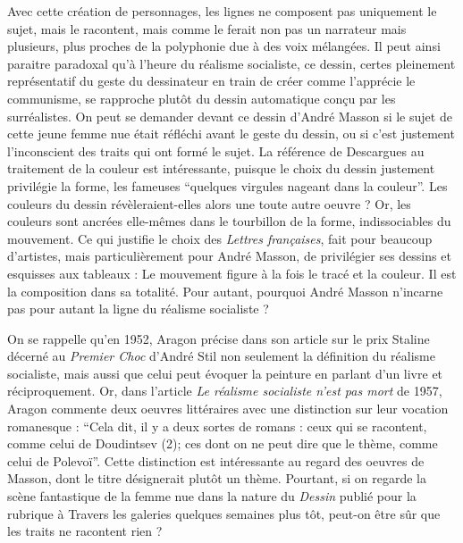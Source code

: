 {	Avec cette création de personnages, les lignes ne composent pas uniquement le sujet, mais le racontent, mais comme le ferait non pas un narrateur mais plusieurs, plus proches de la polyphonie due à des voix mélangées. Il peut ainsi paraitre paradoxal qu’à l’heure du réalisme socialiste, ce dessin, certes pleinement représentatif du geste du dessinateur en train de créer comme l’apprécie le communisme, se rapproche plutôt du dessin automatique conçu par les surréalistes. On peut se demander devant ce dessin d’André Masson si le sujet de cette jeune femme nue était réfléchi avant le geste du dessin, ou si c’est justement l’inconscient des traits qui ont formé le sujet. La référence de Descargues au traitement de la couleur est intéressante, puisque le choix du dessin justement privilégie la forme, les fameuses \enquote{quelques virgules nageant dans la couleur}. Les couleurs du dessin révèleraient-elles alors une toute autre oeuvre ? Or, les couleurs sont ancrées elle-mêmes dans le tourbillon de la forme, indissociables du mouvement. Ce qui justifie le choix des \emph{Lettres françaises}, fait pour beaucoup d’artistes, mais particulièrement pour André Masson, de privilégier ses dessins et esquisses aux tableaux : Le mouvement figure à la fois le tracé et la couleur. Il est la composition dans sa totalité. Pour autant, pourquoi André Masson n’incarne pas pour autant la ligne du réalisme socialiste ? 


On se rappelle qu’en 1952, Aragon précise dans son article sur le prix Staline décerné au \emph{Premier Choc} d’André Stil non seulement la définition du réalisme socialiste, mais aussi que celui peut évoquer la peinture en parlant d’un livre et réciproquement. Or, dans l’article \emph{Le réalisme socialiste n’est pas mort} de 1957, Aragon commente deux oeuvres littéraires avec une distinction sur leur vocation romanesque : \enquote{Cela dit, il y a deux sortes de romans : ceux qui se racontent, comme celui de Doudintsev (2); ces dont on ne peut dire que le thème, comme celui de Polevoï}. Cette distinction est intéressante au regard des oeuvres de Masson, dont le titre désignerait plutôt un thème. Pourtant, si on regarde la scène fantastique de la femme nue dans la nature du \emph{Dessin }publié pour la rubrique à Travers les galeries quelques semaines plus tôt, peut-on être sûr que les traits ne racontent rien ? 

}
